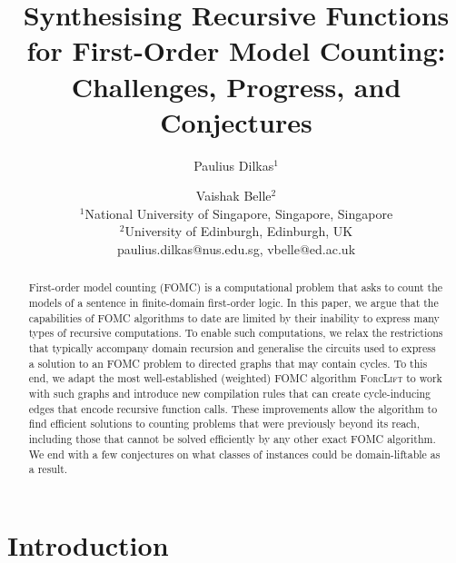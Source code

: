\documentclass{article}
\title{Synthesising Recursive Functions for First-Order Model Counting:\\
  Challenges, Progress, and Conjectures}
\author{%
Paulius Dilkas$^1$\and
Vaishak Belle$^2$\\
\affiliations
$^1$National University of Singapore, Singapore, Singapore\\
$^2$University of Edinburgh, Edinburgh, UK\\
\emails
paulius.dilkas@nus.edu.sg,
vbelle@ed.ac.uk
}
\begin{document}
\maketitle

\begin{abstract}
  First-order model counting (FOMC) is a computational problem that asks to
  count the models of a sentence in finite-domain first-order logic. In this
  paper, we argue that the capabilities of FOMC algorithms to date are limited
  by their inability to express many types of recursive computations. To enable
  such computations, we relax the restrictions that typically accompany domain
  recursion and generalise the circuits used to express a solution to an FOMC
  problem to directed graphs that may contain cycles. To this end, we adapt the
  most well-established (weighted) FOMC algorithm \textsc{ForcLift} to work with
  such graphs and introduce new compilation rules that can create cycle-inducing
  edges that encode recursive function calls. These improvements allow the
  algorithm to find efficient solutions to counting problems that were
  previously beyond its reach, including those that cannot be solved efficiently
  by any other exact FOMC algorithm. We end with a few conjectures on what
  classes of instances could be domain-liftable as a result.
\end{abstract}



\section{Introduction}\label{sec:introduction}
\end{document}
